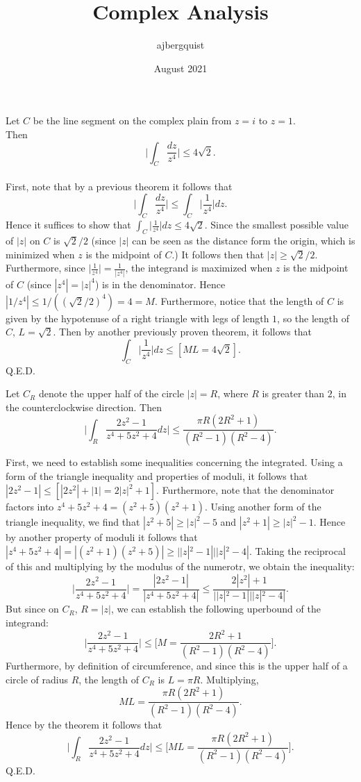 \documentclass{article}
\title{Complex Analysis}
\author{ajbergquist }
\date{August 2021}
\theoremstyle{definition}
\newcommand{\cs}[1]{\color{blue}{#1}\normalcolor}
\begin{document}
 Let $C$ be the line segment on the complex plain from $z = i$ to $z = 1$.\\
Then $$\Big|\int_C\frac{dz}{z^4}\Big| \le 4\sqrt{2}.$$\\

 First, note that by a previous theorem it follows that $$\Big|\int_C\frac{dz}{z^4}\Big| \le \int_C\Big|\frac{1}{z^4}\Big|dz.$$ Hence it suffices to show that $\int_C\Big|\frac{1}{z^4}\Big|dz\le 4\sqrt{2}$. Since the smallest possible value of $|z|$ on $C$ is $\sqrt{2}/2$ (since $|z|$ can be seen as the distance form the origin, which is minimized when $z$ is the midpoint of $C$.) It follows then that $|z|\ge \sqrt{2}/2$. Furthermore, since $\Big|\frac{1}{z^4}\Big| = \frac{1}{|z^4|}$, the integrand is maximized when $z$ is the midpoint of $C$ (since $|z^4| = |z|^4$) is in the denominator. Hence $|1/z^4|\le 1/((\sqrt{2}/2)^4) = 4 = M$. Furthermore, notice that the length of $C$ is given by the hypotenuse of a right triangle with legs of length $1$, so the length of $C$, $L = \sqrt{2}$. Then by another previously proven theorem, it follows that 
$$\int_C\Big|\frac{1}{z^4}\Big|dz\le [ML = 4\sqrt{2}].$$
Q.E.D.\\

\cs{5/5}

 Let $C_R$ denote the upper half of the circle $|z| = R$, where $R$ is greater than $2$, in the counterclockwise direction. Then 
$$\Big|\int_R\frac{2z^2 - 1}{z^4  + 5z^2 + 4}dz\Big|\le \frac{\pi R(2R^2 + 1)}{(R^2-1)(R^2-4)}.$$

First, we need to establish some inequalities concerning the integrated. Using a form of the triangle inequality and properties of moduli, it follows that $|2z^2 - 1| \le [|2z^2| + |1| = 2|z|^2 + 1]$. Furthermore, note that the denominator factors into $z^4 + 5z^2 + 4 = (z^2+5)(z^2+1).$ \cs{Factorization error! :)} Using another form of the triangle inequality, we find that $|z^2 + 5|\ge |z|^2 - 5$ and $|z^2 + 1| \ge |z|^2 - 1$. Hence by another property of moduli it follows that $|z^4 + 5z^2 + 4| = |(z^2 + 1)(z^2 + 5)| \ge ||z|^2 - 1|||z|^2 - 4|.$ \cs{This would have been a 5, not a 4...which gives something smaller...} Taking the reciprocal of this and multiplying by the modulus of the numerotr, we obtain the inequality:
$$\Big|\frac{2z^2 - 1}{z^4  + 5z^2 + 4}\Big| = \frac{|2z^2 - 1|}{|z^4 + 5z^2+ 4|} \le \frac{2|z^2| + 1}{||z|^2 - 1|||z|^2 - 4|}.$$
But since on $C_R$, $R = |z|$, we can establish the following uperbound of the integrand:
$$\Big|\frac{2z^2 - 1}{z^4  + 5z^2 + 4}\Big|\le \Big[M = \frac{2R^2 + 1}{(R^2-1)(R^2-4)}\Big].$$
Furthermore, by definition of circumference, and since this is the upper half of a circle of radius $R$, the length of $C_R$ is $L = \pi R$. Multiplying, $$ML = \frac{\pi R(2R^2 + 1)}{(R^2-1)(R^2-4)}.$$ Hence by the theorem it follows that 
$$\Big|\int_R\frac{2z^2 - 1}{z^4  + 5z^2 + 4}dz\Big|\le \Big[ML = \frac{\pi R(2R^2 + 1)}{(R^2-1)(R^2-4)}\Big].$$ Q.E.D.\\
\end{document}
